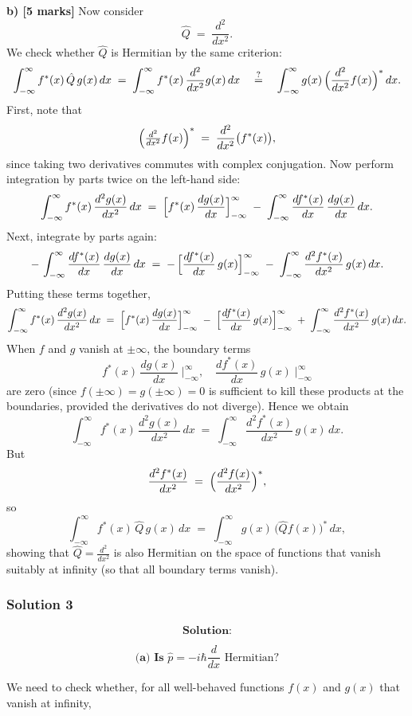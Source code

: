 \documentclass{article}
\begin{document}
\textbf{b) [5 marks]} 
Now consider
\[
\hat{Q} \;=\; \frac{d^2}{dx^2}.
\]
We check whether $\hat{Q}$ is Hermitian by the same criterion:
\[
\int_{-\infty}^{\infty} f^*(x)\,\hat{Q}\,g(x)\,dx
\;=\;
\int_{-\infty}^{\infty} f^*(x)\,\frac{d^2}{dx^2}g(x)\,dx
\quad\stackrel{?}{=}\quad
\int_{-\infty}^{\infty} g(x)\,\Bigl(\frac{d^2}{dx^2}f(x)\Bigr)^*\,dx.
\]
First, note that 
\[
\Bigl(\tfrac{d^2}{dx^2} f(x)\Bigr)^*
\;=\;
\frac{d^2}{dx^2}\bigl(f^*(x)\bigr),
\]
since taking two derivatives commutes with complex conjugation. Now perform integration by parts twice on the left-hand side:
\[
\int_{-\infty}^{\infty} f^*(x)\,\frac{d^2 g(x)}{dx^2}\,dx 
\;=\;
\Bigl[f^*(x)\,\frac{d g(x)}{dx}\Bigr]_{-\infty}^{\infty}
\;-\;
\int_{-\infty}^{\infty} \frac{d f^*(x)}{dx}\,\frac{d g(x)}{dx}\,dx.
\]
Next, integrate by parts again:
\[
-\,\int_{-\infty}^{\infty} \frac{d f^*(x)}{dx}\,\frac{d g(x)}{dx}\,dx
\;=\;
-\,\Bigl[\Bigl.\frac{d f^*(x)}{dx}\,g(x)\Bigr]_{-\infty}^{\infty}
\;-\;
\int_{-\infty}^{\infty} \frac{d^2 f^*(x)}{dx^2}\,g(x)\,dx.
\]
Putting these terms together,
\[
\int_{-\infty}^{\infty} f^*(x)\,\frac{d^2 g(x)}{dx^2}\,dx 
\;=\;
\Bigl[f^*(x)\,\frac{d g(x)}{dx}\Bigr]_{-\infty}^{\infty}
\;-\;
\Bigl[\frac{d f^*(x)}{dx}\,g(x)\Bigr]_{-\infty}^{\infty}
\;+\;
\int_{-\infty}^{\infty} \frac{d^2 f^*(x)}{dx^2}\,g(x)\,dx.
\]
When $f$ and $g$ vanish at $\pm\infty$, the boundary terms 
\[
f^*(x)\,\frac{d g(x)}{dx} \;\biggr|_{-\infty}^{\infty},
\quad
\frac{d f^*(x)}{dx}\,g(x)\;\biggr|_{-\infty}^{\infty}
\]
are zero (since $f(\pm\infty) = g(\pm\infty) = 0$ is sufficient to kill these products at the boundaries, provided the derivatives do not diverge). Hence we obtain
\[
\int_{-\infty}^{\infty} f^*(x)\,\frac{d^2 g(x)}{dx^2}\,dx
\;=\;
\int_{-\infty}^{\infty} \frac{d^2 f^*(x)}{dx^2}\,g(x)\,dx.
\]
But
\[
\frac{d^2 f^*(x)}{dx^2} \;=\; \Bigl(\frac{d^2 f(x)}{dx^2}\Bigr)^*,
\]
so
\[
\int_{-\infty}^{\infty} f^*(x)\,\hat{Q}\,g(x)\,dx
\;=\;
\int_{-\infty}^{\infty} g(x)\,\bigl(\hat{Q}f(x)\bigr)^*\,dx,
\]
showing that $\hat{Q} = \frac{d^2}{dx^2}$ is also Hermitian on the space of functions that vanish suitably at infinity (so that all boundary terms vanish).

\subsubsection{Solution 3}
\[
\textbf{Solution:}
\]

\[
\textbf{(a) Is } \hat{p} = -i\hbar \frac{d}{dx} \text{ Hermitian?}
\]

We need to check whether, for all well-behaved functions \(f(x)\) and \(g(x)\) that vanish at infinity,
\end{document}
